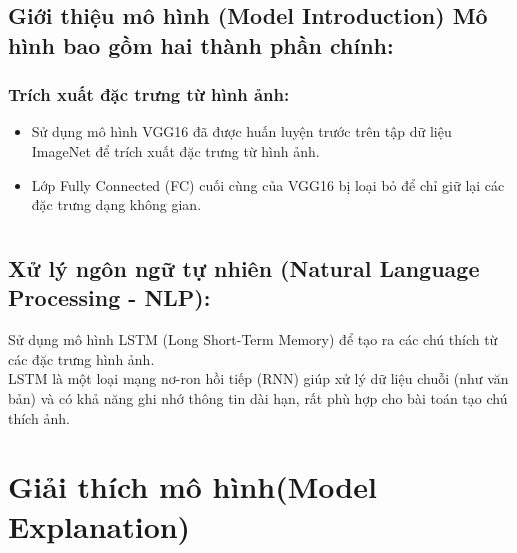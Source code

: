 \documentclass{article}
\begin{document}
\subsection{Giới thiệu mô hình (Model Introduction)
Mô hình bao gồm hai thành phần chính:
}
\subsubsection{Trích xuất đặc trưng từ hình ảnh:}
\begin{itemize}
    \item Sử dụng mô hình VGG16 đã được huấn luyện trước trên tập dữ liệu ImageNet để trích xuất đặc trưng từ hình ảnh.
    \item Lớp Fully Connected (FC) cuối cùng của VGG16 bị loại bỏ để chỉ giữ lại các đặc trưng dạng không gian.
\end{itemize}

\section{}
\subsection{Xử lý ngôn ngữ tự nhiên (Natural Language Processing - NLP): }
 
Sử dụng mô hình LSTM (Long Short-Term Memory) để tạo ra các chú thích từ các đặc trưng hình ảnh.
\\
LSTM là một loại mạng nơ-ron hồi tiếp (RNN) giúp xử lý dữ liệu chuỗi (như văn bản) và có khả năng ghi nhớ thông tin dài hạn, rất phù hợp cho bài toán tạo chú thích ảnh.


\section{ Giải thích mô hình(Model Explanation)}
\end{document}
